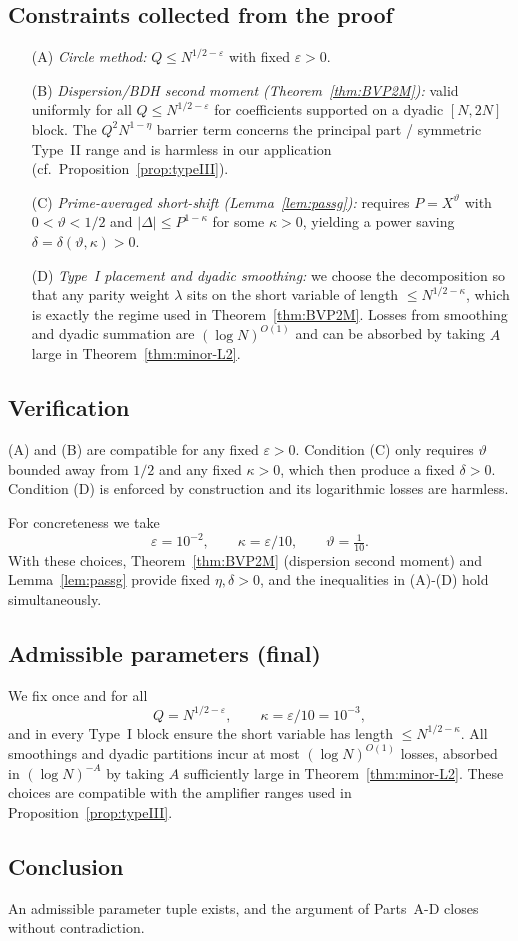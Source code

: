 \documentclass[11pt]{article}
\theoremstyle{definition}
\theoremstyle{remark}
\numberwithin{equation}{part}
\begin{document}
\subsection*{Constraints collected from the proof}
\begin{enumerate}
	\item[(A)] \emph{Circle method:} $Q\le N^{1/2-\varepsilon}$ with fixed $\varepsilon>0$.
	\item[(B)] \emph{Dispersion/BDH second moment (Theorem~\ref{thm:BVP2M}):}
	      valid uniformly for all $Q\le N^{1/2-\varepsilon}$ for coefficients supported on a dyadic $[N,2N]$ block. The $Q^2 N^{1-\eta}$ barrier term concerns the principal part / symmetric Type~II range and is harmless in our application (cf.\ Proposition~\ref{prop:typeIII}).
	\item[(C)] \emph{Prime-averaged short-shift (Lemma~\ref{lem:passg}):}
	      requires $P=X^{\vartheta}$ with $0<\vartheta<1/2$ and $|\Delta|\le P^{1-\kappa}$ for some $\kappa>0$, yielding a power saving $\delta=\delta(\vartheta,\kappa)>0$.
	\item[(D)] \emph{Type~I placement and dyadic smoothing:}
	      we choose the decomposition so that any parity weight $\lambda$ sits on the short variable of length $\le N^{1/2-\kappa}$, which is exactly the regime used in Theorem~\ref{thm:BVP2M}. Losses from smoothing and dyadic summation are $(\log N)^{O(1)}$ and can be absorbed by taking $A$ large in Theorem~\ref{thm:minor-L2}.
\end{enumerate}

\subsection*{Verification}
(A) and (B) are compatible for any fixed $\varepsilon>0$. Condition (C) only requires $\vartheta$ bounded away from $1/2$ and any fixed $\kappa>0$, which then produce a fixed $\delta>0$. Condition (D) is enforced by construction and its logarithmic losses are harmless.

For concreteness we take
\[
	\varepsilon=10^{-2},\qquad
	\kappa=\varepsilon/10,\qquad
	\vartheta=\tfrac{1}{10}.
\]
With these choices, Theorem~\ref{thm:BVP2M} (dispersion second moment) and Lemma~\ref{lem:passg} provide fixed $\eta,\delta>0$, and the inequalities in (A)-(D) hold simultaneously.

\subsection*{Admissible parameters (final)}
We fix once and for all
\[
	Q=N^{1/2-\varepsilon},\qquad \kappa=\varepsilon/10=10^{-3},
\]
and in every Type~I block ensure the short variable has length $\le N^{1/2-\kappa}$. All smoothings and dyadic partitions incur at most $(\log N)^{O(1)}$ losses, absorbed in $(\log N)^{-A}$ by taking $A$ sufficiently large in Theorem~\ref{thm:minor-L2}. These choices are compatible with the amplifier ranges used in Proposition~\ref{prop:typeIII}.

\subsection*{Conclusion}
An admissible parameter tuple exists, and the argument of Parts~A-D closes without contradiction.



\end{document}
